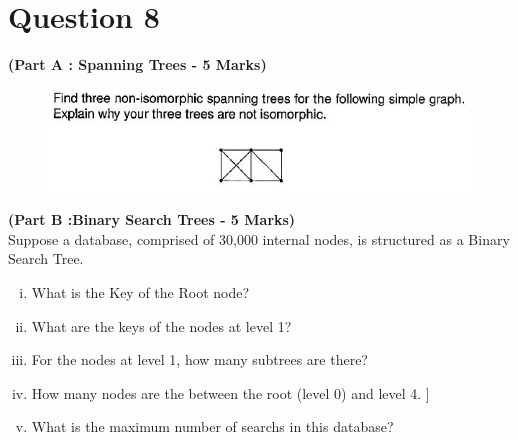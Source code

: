 \documentclass[12pt]{article} %
\begin{document}
\newpage
\section*{Question 8}
\noindent \textbf{(Part A : Spanning Trees -  5 Marks) }\\
\begin{figure}[h!]
\centering
\includegraphics[width=1.11\linewidth]{TreesQuestion2012}
\end{figure}

	

\noindent \textbf{(Part B :Binary Search Trees -  5 Marks) }\\
Suppose a database, comprised of 30,000 internal nodes, is structured as a Binary Search Tree.

\begin{enumerate}[(i)]
	\item What is the Key of the Root node?
	\item What are the keys of the nodes at level 1?
	\item For the nodes at level 1, how many subtrees are there?
	\item How many nodes are the between the root (level 0) and level 4. ]
	\item What is the maximum number of searchs in this database?
\end{enumerate}

\end{document}

